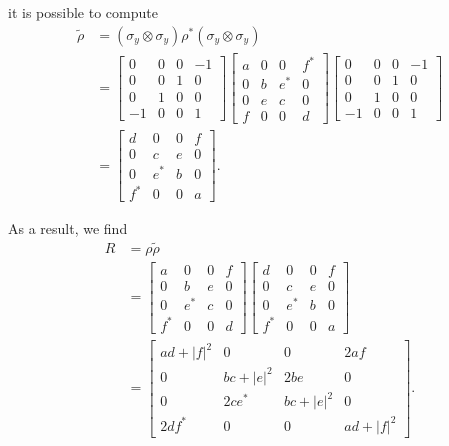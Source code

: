\begin{apendicesenv}
\noindent it is possible to compute
\begin{equation}
    \begin{split}
        \tilde{\rho} &= (\sigma_y \otimes \sigma_y) \rho^* (\sigma_y \otimes \sigma_y)\\
        &= \begin{bmatrix}
        0 & 0 & 0 & -1\\
        0 & 0 & 1 & 0\\
        0 & 1 & 0 & 0\\
        -1 & 0 & 0 & 1
    \end{bmatrix}
    \begin{bmatrix}
        a & 0 & 0 & f^*\\
        0 & b & e^* & 0\\
        0 & e & c & 0\\
        f & 0 & 0 & d
    \end{bmatrix}
    \begin{bmatrix}
        0 & 0 & 0 & -1\\
        0 & 0 & 1 & 0\\
        0 & 1 & 0 & 0\\
        -1 & 0 & 0 & 1
    \end{bmatrix}\\
    &= \begin{bmatrix}
        d & 0 & 0 & f\\
        0 & c & e & 0\\
        0 & e^* & b & 0\\
        f^* & 0 & 0 & a
    \end{bmatrix}.
    \end{split}
\end{equation}

\noindent As a result, we find
\begin{equation}
    \begin{split}
        R &= \rho \tilde{\rho}\\
        &= \begin{bmatrix}
        a & 0 & 0 & f\\
        0 & b & e & 0\\
        0 & e^* & c & 0\\
        f^* & 0 & 0 & d
    \end{bmatrix}
    \begin{bmatrix}
        d & 0 & 0 & f\\
        0 & c & e & 0\\
        0 & e^* & b & 0\\
        f^* & 0 & 0 & a
    \end{bmatrix}\\
    &= \begin{bmatrix}
        ad+|f|^2 & 0 & 0 & 2af\\
        0 & bc+|e|^2 & 2be & 0\\
        0 & 2ce^* & bc+|e|^2 & 0\\
        2df^* & 0 & 0 & ad+|f|^2
    \end{bmatrix}.
    \end{split}
\end{equation}


\end{apendicesenv}
